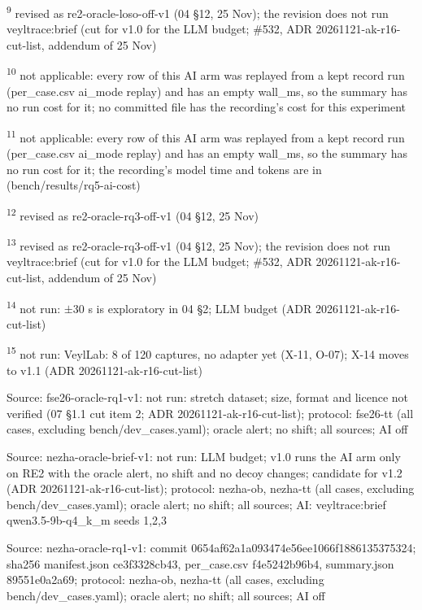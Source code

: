 \textsuperscript{9} revised as re2-oracle-loso-off-v1 (04 \S{}12, 25 Nov); the revision does not run veyltrace:brief (cut for v1.0 for the LLM budget; \#532, ADR 20261121-ak-r16-cut-list, addendum of 25 Nov)\par
\textsuperscript{10} not applicable: every row of this AI arm was replayed from a kept record run (per\_case.csv ai\_mode replay) and has an empty wall\_ms, so the summary has no run cost for it; no committed file has the recording's cost for this experiment\par
\textsuperscript{11} not applicable: every row of this AI arm was replayed from a kept record run (per\_case.csv ai\_mode replay) and has an empty wall\_ms, so the summary has no run cost for it; the recording's model time and tokens are in  (bench/\allowbreak{}results/\allowbreak{}rq5-ai-cost)\par
\textsuperscript{12} revised as re2-oracle-rq3-off-v1 (04 \S{}12, 25 Nov)\par
\textsuperscript{13} revised as re2-oracle-rq3-off-v1 (04 \S{}12, 25 Nov); the revision does not run veyltrace:brief (cut for v1.0 for the LLM budget; \#532, ADR 20261121-ak-r16-cut-list, addendum of 25 Nov)\par
\textsuperscript{14} not run: $\pm$30 s is exploratory in 04 \S{}2; LLM budget (ADR 20261121-ak-r16-cut-list)\par
\textsuperscript{15} not run: VeylLab: 8 of 120 captures, no adapter yet (X-11, O-07); X-14 moves to v1.1 (ADR 20261121-ak-r16-cut-list)\par
\noindent Source: fse26-oracle-rq1-v1: not run: stretch dataset; size, format and licence not verified (07 \S{}1.1 cut item 2; ADR 20261121-ak-r16-cut-list); protocol: fse26-tt (all cases, excluding bench/\allowbreak{}dev\_cases.yaml); oracle alert; no shift; all sources; AI off\par
\noindent Source: nezha-oracle-brief-v1: not run: LLM budget; v1.0 runs the AI arm only on RE2 with the oracle alert, no shift and no decoy changes; candidate for v1.2 (ADR 20261121-ak-r16-cut-list); protocol: nezha-ob, nezha-tt (all cases, excluding bench/\allowbreak{}dev\_cases.yaml); oracle alert; no shift; all sources; AI: veyltrace:brief qwen3.5-9b-q4\_k\_m seeds 1,2,3\par
\noindent Source: nezha-oracle-rq1-v1: commit 0654af62a1a093474e56ee1066f1886135375324; sha256 manifest.json ce3f3328cb43, per\_case.csv f4e5242b96b4, summary.json 89551e0a2a69; protocol: nezha-ob, nezha-tt (all cases, excluding bench/\allowbreak{}dev\_cases.yaml); oracle alert; no shift; all sources; AI off\par
